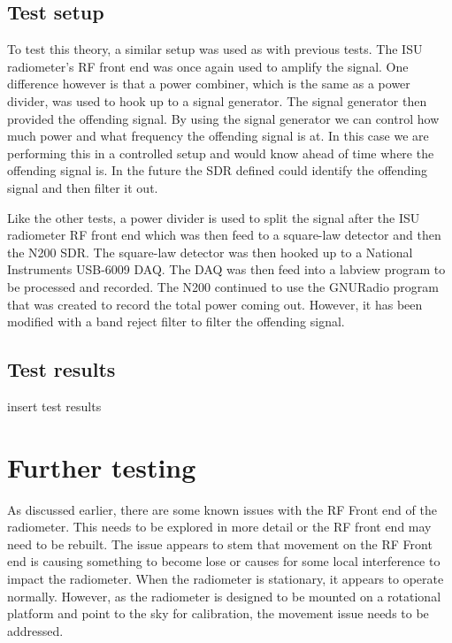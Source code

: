 \subsection{Test setup}
To test this theory, a similar setup was used as with previous tests.  The ISU radiometer's RF front end was once again used to amplify the signal.  One difference however is that a power combiner, which is the same as a power divider, was used to hook up to a signal generator.  The signal generator then provided the offending signal.  By using the signal generator we can control how much power and what frequency the offending signal is at.  In this case we are performing this in a controlled setup and would know ahead of time where the offending signal is.  In the future the SDR defined could identify the offending signal and then filter it out.

Like the other tests, a power divider is used to split the signal after the ISU radiometer RF front end which was then feed to a square-law detector and then the N200 SDR.  The square-law detector was then hooked up to a National Instruments USB-6009 DAQ.  The DAQ was then feed into a labview program to be processed and recorded.  The N200 continued to use the GNURadio program that was created to record the total power coming out.  However, it has been modified with a band reject filter to filter the offending signal.

\subsection{Test results}

insert test results

\section{Further testing}
As discussed earlier, there are some known issues with the RF Front end of the radiometer.  This needs to be explored in more detail or the RF front end may need to be rebuilt.  The issue appears to stem that movement on the RF Front end is causing something to become lose or causes for some local interference to impact the radiometer.  When the radiometer is stationary, it appears to operate normally.  However, as the radiometer is designed to be mounted on a rotational platform and point to the sky for calibration, the movement issue needs to be addressed.  